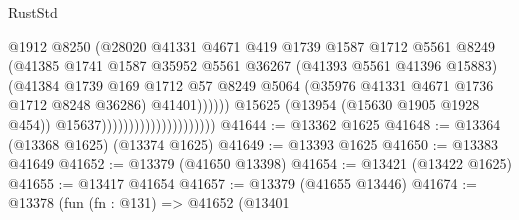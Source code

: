 \begin{lexlean}{RustStd}
\begin{coremodule}
                                                    @1912
                                                    @8250
                                                    (@28020
                                                      @41331
                                                      @4671
                                                      @419
                                                      @1739
                                                      @1587
                                                      @1712
                                                      @5561
                                                      @8249
                                                      (@41385
                                                        @1741
                                                        @1587
                                                        @35952
                                                        @5561
                                                        @36267
                                                        (@41393 @5561 @41396 @15883)
                                                        (@41384
                                                          @1739
                                                          @169
                                                          @1712
                                                          @57
                                                          @8249
                                                          @5064
                                                          (@35976
                                                            @41331
                                                            @4671
                                                            @1736
                                                            @1712
                                                            @8248
                                                            @36286)
                                                          @41401))))))
                                              @15625
                                              (@13954 (@15630 @1905 @1928 @454))
                                              @15637)))))))))))))))))))))
@41644 := @13362 @1625
@41648 := @13364 (@13368 @1625) (@13374 @1625)
@41649 := @13393 @1625
@41650 := @13383 @41649
@41652 := @13379 (@41650 @13398)
@41654 := @13421 (@13422 @1625)
@41655 := @13417 @41654
@41657 := @13379 (@41655 @13446)
@41674 := @13378
    (fun (fn : @131) =>
    @41652
      (@13401

\end{coremodule}
\end{lexlean}
